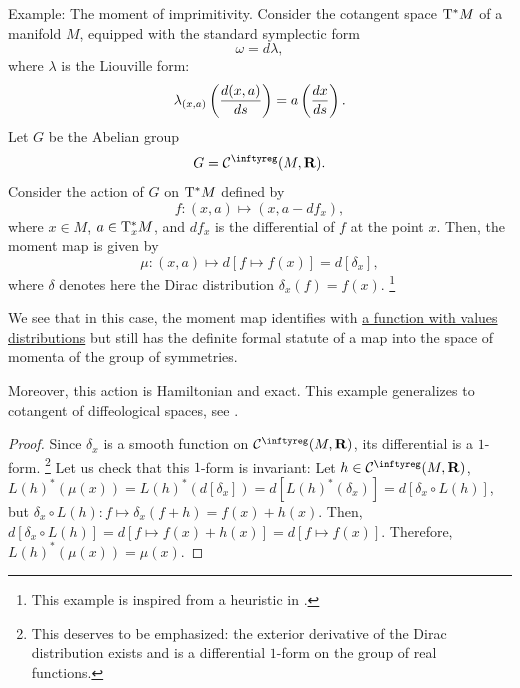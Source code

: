\begin{Article}{Example: The moment of imprimitivity.}
  Consider the cotangent space $\mathrm{T}^*M$ of a manifold $M$,
  equipped with the standard symplectic form
  $$%
    \omega = d\lambda,
    $$%
  where $\lambda$ is the Liouville form:
  $$%
    \lambda_{(x,a)}\left({d(x,a) \over ds}\right) = a\left({dx \over ds}\right).
    $$%
  Let $G$ be the Abelian group
  $$%
    G = \Cinfty(M,\RR).
    $$%
  Consider the action of $G$ on $\mathrm{T}^*M$ defined by
  $$%
    f \colon (x,a) \mapsto (x, a - d f_x),
    $$%
  where $x \in M$,
  $a \in \mathrm{T}^*_xM$,
  and $df_x$ is the differential of $f$ at the point $x$.
  Then,
  the moment map is given by
  $$%
    \mu \colon (x,a) \mapsto d[f \mapsto f(x)] = d[\delta_x],
    $$%
  where $\delta$ denotes here the Dirac distribution $\delta_x(f)=f(x)$.%
  \footnote{This example is inspired from a heuristic in \cite{Zie96}.}
  
  We see that in this case,
  the moment map identifies with \uline{a function with values distributions} but still has the definite formal statute of a map into the space of momenta of the group of symmetries.
  
  Moreover,
  this action is Hamiltonian and exact.
  This example generalizes to cotangent of diffeological spaces,
  see \cite[Exercise 147]{PIZ13}.
\end{Article}

\begin{proof}
  Since $\delta_x$ is a smooth function on $\Cinfty(M,\RR)$,
  its differential is a $1$-form.%
  \footnote{This deserves to be emphasized:
  the exterior derivative of the Dirac distribution exists and is a differential $1$-form on the group of real functions.}
  Let us check that this $1$-form is invariant:
  Let $h \in \Cinfty(M,\RR)$,
  $ L(h)^*(\mu(x))
  = L(h)^*(d[\delta_x])
  = d[L(h)^*(\delta_x)]
  = d[\delta_x \circ L(h)]$,
  but $\delta_x \circ L(h) \colon f \mapsto \delta_x(f+h) = f(x) + h(x)$.
  Then,
  $d[\delta_x \circ L(h)] = d[f \mapsto f(x) + h(x)] = d[f \mapsto f(x)]$.
  Therefore,
  $L(h)^*(\mu(x)) =  \mu(x)$.
\end{proof}

